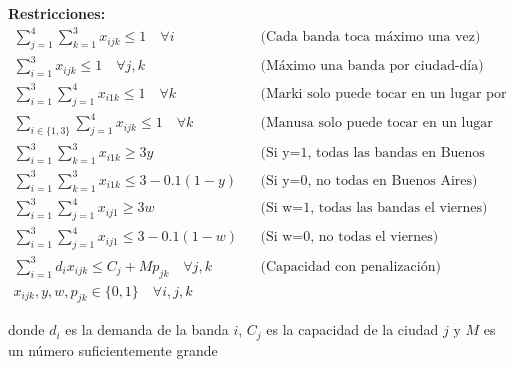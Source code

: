 \documentclass[12pt]{article}
\begin{document}
\textbf{Restricciones:}
\begin{align*}
    \sum_{j=1}^{4} \sum_{k=1}^{3} x_{ijk} \leq 1 \quad \forall i && \text{(Cada banda toca máximo una vez)} \\
    \sum_{i=1}^{3} x_{ijk} \leq 1 \quad \forall j,k && \text{(Máximo una banda por ciudad-día)} \\
    \sum_{i=1}^{3} \sum_{j=1}^{4} x_{i1k} \leq 1 \quad \forall k && \text{(Marki solo puede tocar en un lugar por día)} \\
    \sum_{i \in \{1,3\}} \sum_{j=1}^{4} x_{ijk} \leq 1 \quad \forall k && \text{(Manusa solo puede tocar en un lugar por día)} \\
    \sum_{i=1}^{3} \sum_{k=1}^{3} x_{i1k} \geq 3y && \text{(Si y=1, todas las bandas en Buenos Aires)} \\
    \sum_{i=1}^{3} \sum_{k=1}^{3} x_{i1k} \leq 3 - 0.1(1-y) && \text{(Si y=0, no todas en Buenos Aires)} \\
    \sum_{i=1}^{3} \sum_{j=1}^{4} x_{ij1} \geq 3w && \text{(Si w=1, todas las bandas el viernes)} \\
    \sum_{i=1}^{3} \sum_{j=1}^{4} x_{ij1} \leq 3 - 0.1(1-w) && \text{(Si w=0, no todas el viernes)} \\
    \sum_{i=1}^{3} d_i x_{ijk} \leq C_j + M p_{jk} \quad \forall j,k && \text{(Capacidad con penalización)} \\
    x_{ijk}, y, w, p_{jk} \in \{0,1\} \quad \forall i,j,k
\end{align*}
\begin{center}
donde $d_i$ es la demanda de la banda $i$, $C_j$ es la capacidad de la ciudad $j$ y $M$ es un número suficientemente grande
\end{center}
\end{document}
